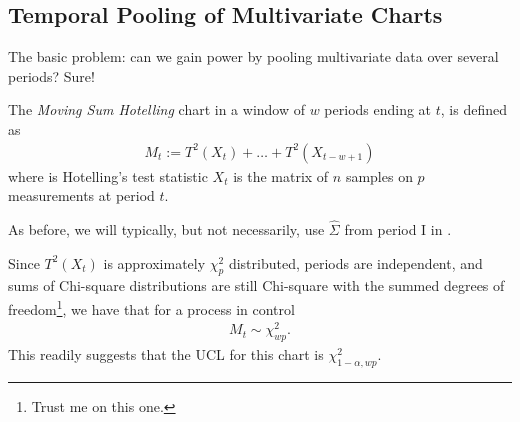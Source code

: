 %
%
%
%











\subsection{Temporal Pooling of Multivariate Charts}
The basic problem: can we gain power by pooling multivariate data over several periods?
Sure!

\begin{definition}
The \emph{Moving Sum Hotelling} chart in a window of $w$ periods ending at $t$, is defined as
\begin{align}
	M_t:= T^2(X_t)+\dots+T^2(X_{t-w+1})
\end{align}
where \tsq is Hotelling's test statistic $X_t$ is the matrix of $n$ samples on $p$ measurements at period $t$. 
\end{definition}
As before, we will typically, but not necessarily, use $\hat{\Sigma}$ from period I in \tsq. 

Since $T^2(X_t)$ is approximately $\chi^2_p$ distributed, periods are independent, and sums of Chi-square distributions are still Chi-square with the summed degrees of freedom\footnote{Trust me on this one.}, we have that for a process in control
\begin{align}
	M_t \sim \chi^2_{wp}.
\end{align}
This readily suggests that the UCL for this chart is $\chi^2_{1-\alpha,wp}$. 

